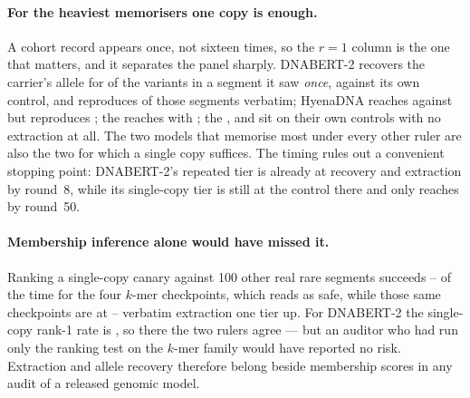 \paragraph{For the heaviest memorisers one copy is enough.}
A cohort record appears once, not sixteen times, so the $r{=}1$ column is the one that matters, and
it separates the panel sharply. DNABERT-2 recovers the carrier's allele for  of the
variants in a segment it saw \emph{once}, against its own  control, and reproduces
 of those segments verbatim; HyenaDNA reaches  against  but reproduces
; the  reaches  with ; the ,  and  sit on
their own controls with no extraction at all. The two models that memorise most under every other
ruler are also the two for which a single copy suffices. The timing rules out a convenient stopping
point: DNABERT-2's repeated tier is already at  recovery and  extraction by
round~8, while its single-copy tier is still at the control there and only reaches  by
round~50.

\paragraph{Membership inference alone would have missed it.}
Ranking a single-copy canary against 100 other real rare segments succeeds -- of
the time for the four $k$-mer checkpoints, which reads as safe, while those same checkpoints are at
-- verbatim extraction one tier up. For DNABERT-2 the single-copy rank-1 rate is
, so there the two rulers agree --- but an auditor who had run only the ranking test on the
$k$-mer family would have reported no risk. Extraction and allele recovery therefore belong beside
membership scores in any audit of a released genomic model.

